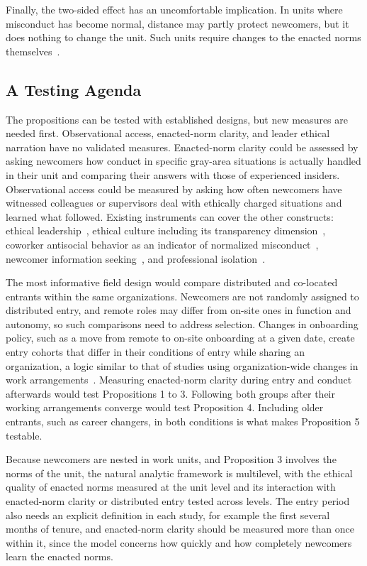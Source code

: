 Finally, the two-sided effect has an uncomfortable implication. In units where misconduct has become normal, distance may partly protect newcomers, but it does nothing to change the unit. Such units require changes to the enacted norms themselves~\citep{ashforth2003normalization}.

\subsection{A Testing Agenda}

The propositions can be tested with established designs, but new measures are needed first. Observational access, enacted-norm clarity, and leader ethical narration have no validated measures. Enacted-norm clarity could be assessed by asking newcomers how conduct in specific gray-area situations is actually handled in their unit and comparing their answers with those of experienced insiders. Observational access could be measured by asking how often newcomers have witnessed colleagues or supervisors deal with ethically charged situations and learned what followed. Existing instruments can cover the other constructs: ethical leadership~\citep{brown2005ethical}, ethical culture including its transparency dimension~\citep{kaptein2008developing}, coworker antisocial behavior as an indicator of normalized misconduct~\citep{robinson1998monkey}, newcomer information seeking~\citep{morrison1993newcomer}, and professional isolation~\citep{golden2008impact}.

The most informative field design would compare distributed and co-located entrants within the same organizations. Newcomers are not randomly assigned to distributed entry, and remote roles may differ from on-site ones in function and autonomy, so such comparisons need to address selection. Changes in onboarding policy, such as a move from remote to on-site onboarding at a given date, create entry cohorts that differ in their conditions of entry while sharing an organization, a logic similar to that of studies using organization-wide changes in work arrangements~\citep{yang2022effects}. Measuring enacted-norm clarity during entry and conduct afterwards would test Propositions 1 to 3. Following both groups after their working arrangements converge would test Proposition 4. Including older entrants, such as career changers, in both conditions is what makes Proposition 5 testable.

Because newcomers are nested in work units, and Proposition 3 involves the norms of the unit, the natural analytic framework is multilevel, with the ethical quality of enacted norms measured at the unit level and its interaction with enacted-norm clarity or distributed entry tested across levels. The entry period also needs an explicit definition in each study, for example the first several months of tenure, and enacted-norm clarity should be measured more than once within it, since the model concerns how quickly and how completely newcomers learn the enacted norms.

